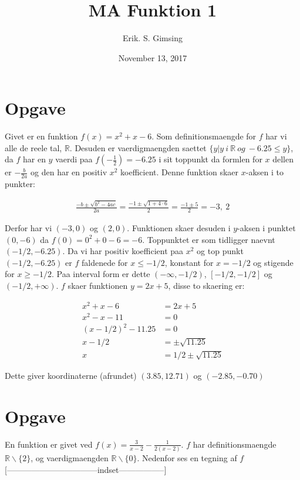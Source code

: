 \documentclass{article}
\title{MA Funktion 1}
\author{Erik. S. Gimsing}
\date{November 13, 2017}
\begin{document}
\maketitle

\section{Opgave}

Givet er en funktion $f(x) = x^2 + x - 6$. Som definitionsmaengde for $f$ har vi 
alle de reele tal, $\mathbb{R}$. Desuden er vaerdigmaengden saettet 
$\{ y | y\	i\ \mathbb{R}\ og\ -6.25 \leq y\}$, da $f$ har en $y$ vaerdi paa 
$f(-\frac{1}{2})= -6.25$ i sit toppunkt da formlen for $x$ dellen er
$-\frac{b}{2a}$ og den har en positiv $x^2$ koefficient. Denne
funktion skaer $x$-aksen i to punkter:

\begin{align}
	\frac{-b \pm \sqrt{b^2-4ac}}{2a} = \frac{-1 \pm \sqrt{1+4 \cdot 6}}{2} 
	= \frac{-1 \pm 5}{2} = -3,\ 2
\end{align}

Derfor har vi $(-3,0)$ og $(2,0)$. Funktionen skaer desuden i $y$-aksen i
punktet $(0,-6)$ da $f(0) = 0^2 + 0 - 6 = -6 $. Toppunktet er som tidligger
naevnt $(-1/2,-6.25)$. Da vi har positiv koefficient
paa $x^2$ og top punkt $(-1/2,-6.25)$ er $f$ faldenede for $x \leq -1/2$,
konstant for $x = -1/2$ og stigende for $x \geq -1/2$. Paa interval form er
dette $(-\infty, -1/2)$, $[-1/2,-1/2]$ og $(-1/2,+\infty)$. $f$ skaer funktionen
$y = 2x + 5$, disse to skaering er:

\begin{align}
	x^2 + x - 6 &= 2x + 5 \\
	x^2 - x - 11 &= 0 \nonumber \\
	{(x-1/2)}^2 - 11.25 &= 0 \nonumber \\
	x-1/2 &= \pm \sqrt{11.25} \nonumber \\
	x &= 1/2 \pm \sqrt{11.25} \nonumber
\end{align}

Dette giver koordinaterne (afrundet) $(3.85,12.71)$ og $(-2.85,-0.70)$

\section{Opgave}

En funktion er givet ved $f(x) = \frac{3}{x-2} - \frac{1}{2(x-2)}$. $f$ har
definitionsmaengde $\mathbb{R}\backslash \{2\}$, og vaerdigmaengden
$\mathbb{R}\backslash \{0\}$. Nedenfor ses en tegning af $f$
[---------------------------------indset-----------------]
\end{document}
